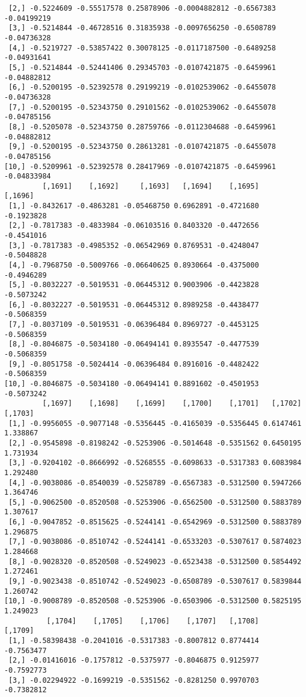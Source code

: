 \documentclass[
  letterpaper,
  DIV=11,
  numbers=noendperiod]{scrreprt}
\begin{document}
\begin{verbatim}
 [2,] -0.5224609 -0.55517578 0.25878906 -0.0004882812 -0.6567383 -0.04199219
 [3,] -0.5214844 -0.46728516 0.31835938 -0.0097656250 -0.6508789 -0.04736328
 [4,] -0.5219727 -0.53857422 0.30078125 -0.0117187500 -0.6489258 -0.04931641
 [5,] -0.5214844 -0.52441406 0.29345703 -0.0107421875 -0.6459961 -0.04882812
 [6,] -0.5200195 -0.52392578 0.29199219 -0.0102539062 -0.6455078 -0.04736328
 [7,] -0.5200195 -0.52343750 0.29101562 -0.0102539062 -0.6455078 -0.04785156
 [8,] -0.5205078 -0.52343750 0.28759766 -0.0112304688 -0.6459961 -0.04882812
 [9,] -0.5200195 -0.52343750 0.28613281 -0.0107421875 -0.6455078 -0.04785156
[10,] -0.5209961 -0.52392578 0.28417969 -0.0107421875 -0.6459961 -0.04833984
         [,1691]    [,1692]     [,1693]   [,1694]    [,1695]    [,1696]
 [1,] -0.8432617 -0.4863281 -0.05468750 0.6962891 -0.4721680 -0.1923828
 [2,] -0.7817383 -0.4833984 -0.06103516 0.8403320 -0.4472656 -0.4541016
 [3,] -0.7817383 -0.4985352 -0.06542969 0.8769531 -0.4248047 -0.5048828
 [4,] -0.7968750 -0.5009766 -0.06640625 0.8930664 -0.4375000 -0.4946289
 [5,] -0.8032227 -0.5019531 -0.06445312 0.9003906 -0.4423828 -0.5073242
 [6,] -0.8032227 -0.5019531 -0.06445312 0.8989258 -0.4438477 -0.5068359
 [7,] -0.8037109 -0.5019531 -0.06396484 0.8969727 -0.4453125 -0.5068359
 [8,] -0.8046875 -0.5034180 -0.06494141 0.8935547 -0.4477539 -0.5068359
 [9,] -0.8051758 -0.5024414 -0.06396484 0.8916016 -0.4482422 -0.5068359
[10,] -0.8046875 -0.5034180 -0.06494141 0.8891602 -0.4501953 -0.5073242
         [,1697]    [,1698]    [,1699]    [,1700]    [,1701]   [,1702]  [,1703]
 [1,] -0.9956055 -0.9077148 -0.5356445 -0.4165039 -0.5356445 0.6147461 1.338867
 [2,] -0.9545898 -0.8198242 -0.5253906 -0.5014648 -0.5351562 0.6450195 1.731934
 [3,] -0.9204102 -0.8666992 -0.5268555 -0.6098633 -0.5317383 0.6083984 1.292480
 [4,] -0.9038086 -0.8540039 -0.5258789 -0.6567383 -0.5312500 0.5947266 1.364746
 [5,] -0.9062500 -0.8520508 -0.5253906 -0.6562500 -0.5312500 0.5883789 1.307617
 [6,] -0.9047852 -0.8515625 -0.5244141 -0.6542969 -0.5312500 0.5883789 1.296875
 [7,] -0.9038086 -0.8510742 -0.5244141 -0.6533203 -0.5307617 0.5874023 1.284668
 [8,] -0.9028320 -0.8520508 -0.5249023 -0.6523438 -0.5312500 0.5854492 1.272461
 [9,] -0.9023438 -0.8510742 -0.5249023 -0.6508789 -0.5307617 0.5839844 1.260742
[10,] -0.9008789 -0.8520508 -0.5253906 -0.6503906 -0.5312500 0.5825195 1.249023
          [,1704]    [,1705]    [,1706]    [,1707]   [,1708]    [,1709]
 [1,] -0.58398438 -0.2041016 -0.5317383 -0.8007812 0.8774414 -0.7563477
 [2,] -0.01416016 -0.1757812 -0.5375977 -0.8046875 0.9125977 -0.7592773
 [3,] -0.02294922 -0.1699219 -0.5351562 -0.8281250 0.9970703 -0.7382812

\end{verbatim}
\end{document}
